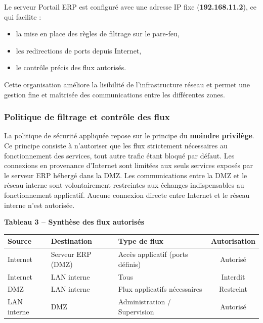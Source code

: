 \noindent Le serveur Portail ERP est configuré avec une adresse IP fixe (\textbf{192.168.11.2}), ce qui facilite :
\begin{itemize}
    \item la mise en place des règles de filtrage sur le pare-feu,
    \item les redirections de ports depuis Internet,
    \item le contrôle précis des flux autorisés.
\end{itemize}

\noindent Cette organisation améliore la lisibilité de l’infrastructure réseau et permet une gestion fine et maîtrisée des communications entre les différentes zones.

\subsubsection*{Politique de filtrage et contrôle des flux}

\noindent La politique de sécurité appliquée repose sur le principe du \textbf{moindre privilège}. Ce principe consiste à n’autoriser que les flux strictement nécessaires au fonctionnement des services, tout autre trafic étant bloqué par défaut.
Les connexions en provenance d’Internet sont limitées aux seuls services exposés par le serveur ERP hébergé dans la DMZ. Les communications entre la DMZ et le réseau interne sont volontairement restreintes aux échanges indispensables au fonctionnement applicatif.  
Aucune connexion directe entre Internet et le réseau interne n’est autorisée.

\vspace{0.5cm}


\begin{center}
\textbf{Tableau 3 – Synthèse des flux autorisés}
\end{center}

\vspace{0.5cm}

\begin{center}
\begin{tabular}{|l|l|l|c|}
\hline
\textbf{Source} & \textbf{Destination} & \textbf{Type de flux} & \textbf{Autorisation} \\
\hline
Internet & Serveur ERP (DMZ) & Accès applicatif (ports définis) & Autorisé \\
Internet & LAN interne & Tous & Interdit \\
DMZ & LAN interne & Flux applicatifs nécessaires & Restreint \\
LAN interne & DMZ & Administration / Supervision & Autorisé \\
\hline
\end{tabular}
\end{center}

